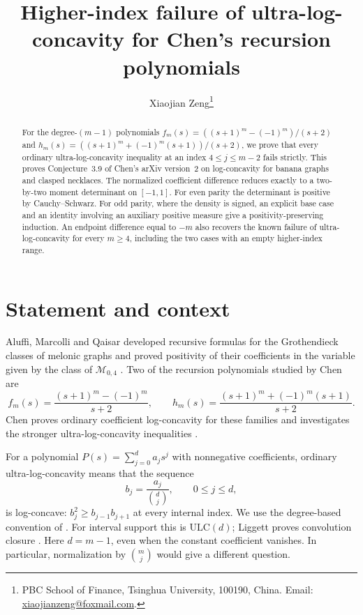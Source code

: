 \documentclass[11pt]{article}
\title{Higher-index failure of ultra-log-concavity\newline
for Chen's recursion polynomials}
\author{Xiaojian Zeng\thanks{PBC School of Finance, Tsinghua University,
100190, China. Email: \href{mailto:xiaojianzeng@foxmail.com}{xiaojianzeng@foxmail.com}.}}
\date{}
\newcommand{\ULC}{\mathrm{ULC}}
\begin{document}
\maketitle

\begin{abstract}
For the degree-$(m-1)$ polynomials
$f_m(s)=((s+1)^m-(-1)^m)/(s+2)$ and
$h_m(s)=((s+1)^m+(-1)^m(s+1))/(s+2)$, we prove that every
ordinary ultra-log-concavity inequality at an index
$4\le j\le m-2$ fails strictly. This proves Conjecture~3.9 of
Chen's arXiv version~2 on log-concavity for banana graphs and clasped
necklaces. The normalized coefficient difference reduces exactly to a
two-by-two moment determinant on $[-1,1]$. For even parity the determinant
is positive by Cauchy--Schwarz. For odd parity, where the density is signed,
an explicit base case and an identity involving an auxiliary positive
measure give a positivity-preserving induction. An endpoint difference
equal to $-m$ also recovers the known failure of ultra-log-concavity for
every $m\ge4$, including the two cases with an empty higher-index range.
\end{abstract}

\section{Statement and context}

Aluffi, Marcolli and Qaisar developed recursive formulas for the
Grothendieck classes of melonic graphs and proved positivity of their
coefficients in the variable given by the class of $\mathcal M_{0,4}$
\cite[Proposition~3.2 and Corollary~3.4]{AMQ2023}.
Two of the recursion polynomials studied by Chen are
\begin{equation}\label{eq:families}
 f_m(s)=\frac{(s+1)^m-(-1)^m}{s+2},\qquad
 h_m(s)=\frac{(s+1)^m+(-1)^m(s+1)}{s+2}.
\end{equation}
Chen proves ordinary coefficient log-concavity for these families and
investigates the stronger ultra-log-concavity inequalities
\cite[Theorem~1.1 and Section~3]{Chen2025}.

For a polynomial $P(s)=\sum_{j=0}^{d}a_js^j$ with nonnegative coefficients,
ordinary ultra-log-concavity means that the sequence
\begin{equation}\label{eq:normalization}
 b_j=\frac{a_j}{\binom dj},\qquad 0\le j\le d,
\end{equation}
is log-concave: $b_j^2\ge b_{j-1}b_{j+1}$ at every internal index.
We use the degree-based convention of
\cite[Definition~2.4]{Chen2025}. For interval support this is $\ULC(d)$;
Liggett proves convolution closure \cite{Liggett1997}.
Here $d=m-1$, even when the constant coefficient vanishes. In particular,
normalization by $\binom mj$ would give a different question.
\end{document}
